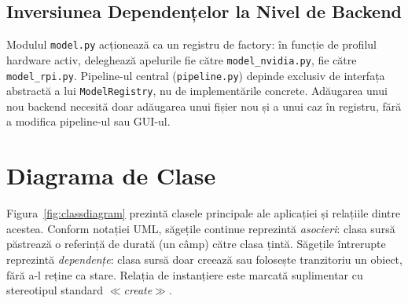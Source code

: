 \subsection{Inversiunea Dependențelor la Nivel de Backend}

Modulul \texttt{model.py} acționează ca un registru de factory: în funcție de profilul hardware activ, deleghează apelurile fie către \texttt{model\_nvidia.py}, fie către \texttt{model\_rpi.py}. Pipeline-ul central (\texttt{pipeline.py}) depinde exclusiv de interfața abstractă a lui \texttt{ModelRegistry}, nu de implementările concrete. Adăugarea unui nou backend necesită doar adăugarea unui fișier nou și a unui caz în registru, fără a modifica pipeline-ul sau GUI-ul.

\section{Diagrama de Clase}

Figura~\ref{fig:classdiagram} prezintă clasele principale ale aplicației și relațiile dintre acestea. Conform notației UML, săgețile continue reprezintă \emph{asocieri}: clasa sursă păstrează o referință de durată (un câmp) către clasa țintă. Săgețile întrerupte reprezintă \emph{dependențe}: clasa sursă doar creează sau folosește tranzitoriu un obiect, fără a-l reține ca stare. Relația de instanțiere este marcată suplimentar cu stereotipul standard $\ll$\textit{create}$\gg$.

